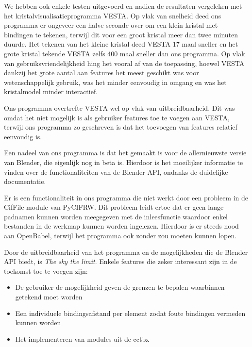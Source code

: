 We hebben ook enkele testen uitgevoerd en nadien de resultaten vergeleken met het kristalvisualisatieprogramma VESTA. Op vlak van snelheid deed ons programma er ongeveer een halve seconde over om een klein kristal met bindingen te tekenen, terwijl dit voor een groot kristal meer dan twee minuten duurde. Het tekenen van het kleine kristal deed VESTA 17 maal sneller en het grote kristal tekende VESTA zelfs 400 maal sneller dan ons programma. Op vlak van gebruiksvriendelijkheid hing het vooral af van de toepassing, hoewel VESTA dankzij het grote aantal aan features het meest geschikt was voor wetenschappelijk gebruik, was het minder eenvoudig in omgang en was het kristalmodel minder interactief. 
\par
Ons programma overtrefte VESTA wel op vlak van uitbreidbaarheid. Dit was omdat het niet mogelijk is als gebruiker features toe te voegen aan VESTA, terwijl ons programma zo geschreven is dat het toevoegen van features relatief eenvoudig is. 
\par 
Een nadeel van ons programma is dat het gemaakt is voor de allernieuwste versie van Blender, die eigenlijk nog in beta is. Hierdoor is het moeilijker informatie te vinden over de functionaliteiten van de Blender API, ondanks de duidelijke documentatie.
\par
Er is een functionaliteit in ons programma die niet werkt door een probleem in de CifFile module van PyCIFRW. Dit probleem leidt ertoe dat er geen lange padnamen kunnen worden meegegeven met de inleesfunctie waardoor enkel bestanden in de werkmap kunnen worden ingelezen. Hierdoor is er steeds nood aan OpenBabel, terwijl het programma ook zonder zou moeten kunnen lopen.
\par
Door de uitbreidbaarheid van het programma en de mogelijkheden die de Blender API biedt, is \textit{The sky the limit}. Enkele features die zeker interessant zijn in de toekomst toe te voegen zijn:
\begin{itemize}
\item De gebruiker de mogelijkheid geven de grenzen te bepalen waarbinnen getekend moet worden
\item Een individuele bindingsafstand per element zodat foute bindingen vermeden kunnen worden
\item Het implementeren van modules uit de cctbx 
\end{itemize}
 